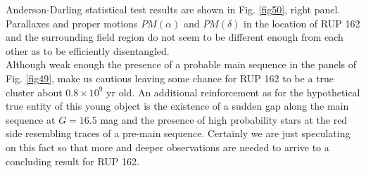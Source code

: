\documentclass[draft]{aa}
\begin{document}
Anderson-Darling statistical test results are shown in Fig. \ref{fig50}, right
panel. Parallaxes and proper motions $PM(\alpha)$ and $PM(\delta)$ in the
location of RUP 162 and the surrounding field region do not seem to be
different enough from each other as to be efficiently disentangled.\\

Although weak enough the presence of a probable main sequence in the 
panels of Fig. \ref{fig49}, make us cautious leaving some chance for RUP 162 to
be a true cluster about $0.8\times10^9$ yr old. An additional
reinforcement as for the hypothetical true entity of this young object is the
existence of a sudden gap along the main sequence at $G=16.5$ mag and the
presence of high probability stars at the red side resembling traces of a
pre-main sequence. Certainly we are just speculating on this fact so that more
and deeper observations are needed to arrive to a concluding result for RUP
162.
\end{document}
